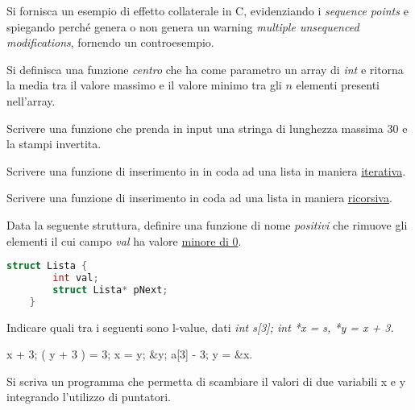 \documentclass[addpoints,11pt]{exam}
\begin{document}
\begin{questions}
\question[1]
Si fornisca un esempio di effetto collaterale in C, evidenziando i \emph{sequence points} e spiegando perché genera o non genera un warning \emph{multiple unsequenced modifications}, fornendo un controesempio.
\makeemptybox{75pt}



\question[2]
Si definisca una funzione \emph{centro} che ha come parametro un array di \emph{int} e ritorna la media tra il valore massimo e il valore minimo tra gli $n$ elementi presenti nell'array.
\makeemptybox{100pt}



\question[2]
Scrivere una funzione che prenda in input una stringa di lunghezza massima 30 e la stampi invertita.
\makeemptybox{100pt}



\question[1]
Scrivere una funzione di inserimento in in coda ad una lista in maniera \underline{iterativa}.
\makeemptybox{100pt}



\question[2]
Scrivere una funzione di inserimento in coda ad una lista in maniera \underline{ricorsiva}.
\makeemptybox{100pt}



\question[4]
Data la seguente struttura, definire una funzione di nome \emph{positivi} che rimuove gli elementi il cui campo \emph{val} ha valore \underline{minore di 0}.

\begin{minipage}{0.4\linewidth}
	\begin{lstlisting}[language=C]
	struct Lista {
		int val;
		struct Lista* pNext;
	}\end{lstlisting}
\end{minipage}
\begin{minipage}{0.6\linewidth}
	\makeemptybox{100pt}
\end{minipage}



\question[1]
Indicare quali tra i seguenti sono l-value, dati \emph{int s[3]; int *x = s, *y = x + 3.}

\begin{oneparcheckboxes}
	\choice x + 3;
	\choice *( y + 3 ) = 3;
	\choice *x = y;
	\choice \&y;
	\choice a[3] - 3;
	\choice y = \&x.
\end{oneparcheckboxes}



\question [1]Si scriva un programma che permetta di scambiare il valori di due variabili x e y integrando l'utilizzo di puntatori.
\makeemptybox{100pt}




\end{questions}
\end{document}
